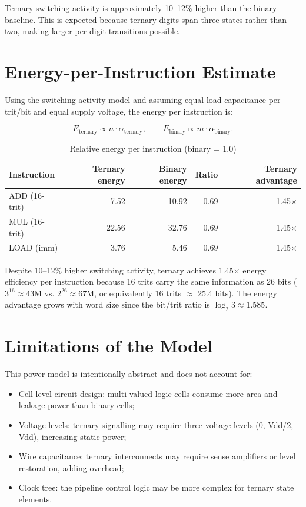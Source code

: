 \documentclass[12pt,a4paper,twoside]{book}
\theoremstyle{trinarytheorem}
\theoremstyle{trinarydefinition}
\begin{document}
Ternary switching activity is approximately 10--12\% higher than the
binary baseline. This is expected because ternary digits span three
states rather than two, making larger per-digit transitions possible.

\section{Energy-per-Instruction Estimate}

Using the switching activity model and assuming equal load capacitance
per trit/bit and equal supply voltage, the energy per instruction is:

\[
E_{\text{ternary}} \propto n \cdot \alpha_{\text{ternary}},\qquad
E_{\text{binary}} \propto m \cdot \alpha_{\text{binary}}.
\]

\begin{table}[H]
\centering
\caption{Relative energy per instruction (binary = 1.0)}
\label{tab:energyperinstr}
\begin{tabular}{lrrrr}
\toprule
Instruction & Ternary energy & Binary energy & Ratio & Ternary advantage \\
\midrule
ADD (16-trit) & 7.52 & 10.92 & 0.69 & 1.45$\times$ \\
MUL (16-trit) & 22.56 & 32.76 & 0.69 & 1.45$\times$ \\
LOAD (imm) & 3.76 & 5.46 & 0.69 & 1.45$\times$ \\
\bottomrule
\end{tabular}
\end{table}

Despite 10--12\% higher switching activity, ternary achieves 1.45$\times$
energy efficiency per instruction because 16 trits carry the same
information as 26 bits ($3^{16} \approx 43$M vs. $2^{26} \approx 67$M,
or equivalently 16 trits $\approx$ 25.4 bits). The energy advantage
grows with word size since the bit/trit ratio is $\log_2 3 \approx 1.585$.

\section{Limitations of the Model}

This power model is intentionally abstract and does not account for:

\begin{itemize}
    \item Cell-level circuit design: multi-valued logic cells consume
          more area and leakage power than binary cells;
    \item Voltage levels: ternary signalling may require three voltage
          levels (0, Vdd/2, Vdd), increasing static power;
    \item Wire capacitance: ternary interconnects may require sense
          amplifiers or level restoration, adding overhead;
    \item Clock tree: the pipeline control logic may be more complex
          for ternary state elements.
\end{itemize}
\end{document}
